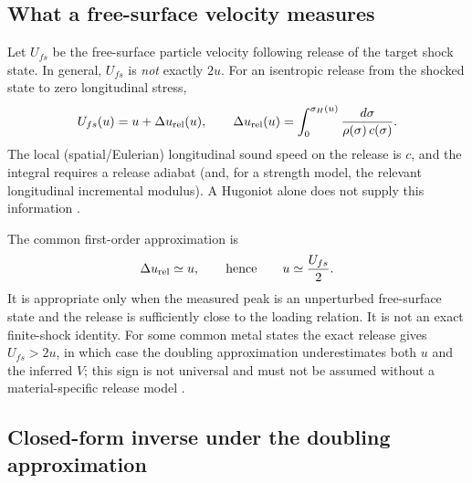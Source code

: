 \documentclass[11pt]{article}
\newcommand{\sig}{\sigma}
\begin{document}
\subsection{What a free-surface velocity measures}

Let $U_{fs}$ be the free-surface particle velocity following release of the
target shock state.  In general, $U_{fs}$ is \emph{not} exactly $2u$.  For an
isentropic release from the shocked state to zero longitudinal stress,
\begin{equation}
  U_{fs}(u)=u+\Delta u_{\rm rel}(u),\qquad
  \Delta u_{\rm rel}(u)=
  \int_{0}^{\sig_H(u)}\frac{d\sig}{\rho(\sig)\,c(\sig)}.
  \label{eq:free-surface-exact}
\end{equation}
The local (spatial/Eulerian) longitudinal sound speed on the release is $c$,
and the integral requires a release adiabat (and, for a strength model, the
relevant longitudinal incremental modulus).  A Hugoniot alone does not supply
this information \cite{LyzengaAhrens1978,Kerley2008}.

The common first-order approximation is
\begin{equation}
  \Delta u_{\rm rel}\simeq u,
  \qquad\text{hence}\qquad u\simeq\frac{U_{fs}}{2}.
  \label{eq:free-surface-double}
\end{equation}
It is appropriate only when the measured peak is an unperturbed free-surface
state and the release is sufficiently close to the loading relation.  It is
not an exact finite-shock identity.  For some common metal states the exact
release gives $U_{fs}>2u$, in which case the doubling approximation
underestimates both $u$ and the inferred $V$; this sign is not universal and
must not be assumed without a material-specific release model
\cite{Kerley2008}.

\subsection{Closed-form inverse under the doubling approximation}
\end{document}
